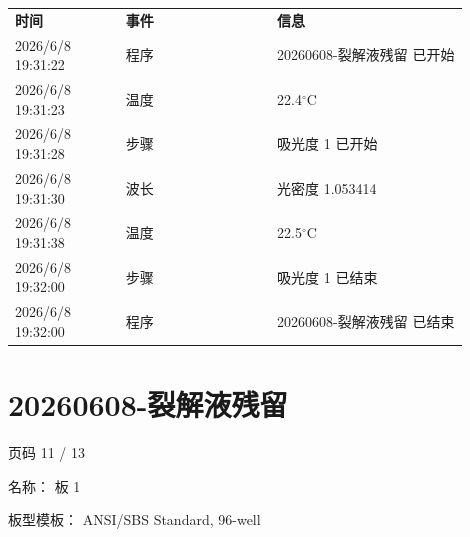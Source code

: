 \documentclass[UTF8,10pt,a4paper,fontset=fandol]{ctexart}
\newcommand{\fieldvalue}[1]{#1}
\begin{document}
\begin{tabular}{@{}p{0.22\linewidth}p{0.30\linewidth}p{0.38\linewidth}@{}}
\textbf{时间} & \textbf{事件} & \textbf{信息}\\
2026/6/8 19:31:22 & 程序 & 20260608-裂解液残留 已开始\\
2026/6/8 19:31:23 & 温度 & 22.4$^\circ$C\\
2026/6/8 19:31:28 & 步骤 & 吸光度 1 已开始\\
2026/6/8 19:31:30 & 波长 & 光密度 1.053414\\
2026/6/8 19:31:38 & 温度 & 22.5$^\circ$C\\
2026/6/8 19:32:00 & 步骤 & 吸光度 1 已结束\\
2026/6/8 19:32:00 & 程序 & 20260608-裂解液残留 已结束\\
\end{tabular}

\newpage

\section*{20260608-裂解液残留}

\noindent 页码 11 / 13

\noindent 名称：
\fieldvalue{板 1}

\noindent 板型模板：
\fieldvalue{ANSI/SBS Standard, 96-well}
\end{document}
